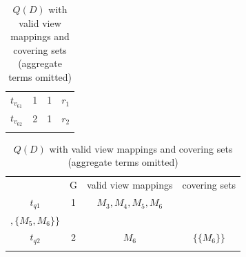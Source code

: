 \begin{example}
\begin{table}
\begin{tabular}[t]{c|c|c||b|}
$t_{v_61}$&1&1&$r_1$\\ \hhline{~---}
$t_{v_62}$&2&1&$r_2$\\ \hhline{~---}
\end{tabular}
\medskip
\caption{$Q(D)$ with valid view mappings and covering sets (aggregate terms omitted)}\label{Instance of Q1 with view mappings}
\vspace*{-0.2cm}
\hspace*{-0.2cm}
\begin{tabular}[t]{c|c||c|c|} \hhline{~---}
&G&valid view mappings&covering sets\\ \hhline{~---}
$t_{q1}$&1&$M_3, M_4, M_5, M_6$&\makecell{$\{\{M_3\}, \{M_4, M_5\}$\\$, \{M_5, M_6\}\}$}\\ \hhline{~---}
$t_{q2}$&2&$M_6$&$\{\{M_6\}\}$\\ \hhline{~---}
\end{tabular}
\end{table}





\end{example}

